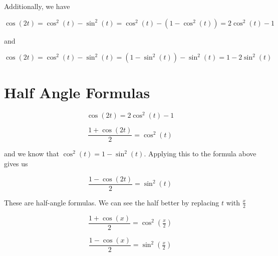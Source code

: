 \documentclass{ximera}
\begin{document}
Additionally, we have 




\[   \cos(2t) =    \cos^2(t) - \sin^2(t)  =    \cos^2(t) - (1 - \cos^2(t)) =  2 \cos^2(t) - 1 \]


and

\[   \cos(2t) =    \cos^2(t) - \sin^2(t)  =    (1 - \sin^2(t)) - \sin^2(t)  = 1 - 2 \sin^2(t)     \]




































\section*{Half Angle Formulas}



\[   \cos(2t)  =  2 \cos^2(t) - 1 \]


\[   \frac{1 + \cos(2t)}{2}  =   \cos^2(t)  \]



and we know that $\cos^2(t) = 1- \sin^2(t)$. Applying this to the formula above gives us

\[  \frac{1 -  \cos(2t)}{2}  =  \sin^2(t)     \]



These are half-angle formulas.  We can see the half better by replacing $t$ with $\frac{x}{2}$



\[   \frac{1 + \cos(x)}{2}  =   \cos^2\left( \tfrac{x}{2} \right)  \]



\[   \frac{1 - \cos(x)}{2}  =   \sin^2\left( \tfrac{x}{2} \right)  \]
\end{document}
